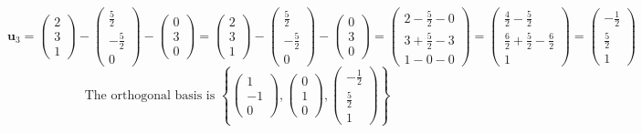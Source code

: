 \documentclass[a3paper,12pt]{extarticle} %
\begin{document}
\begin{enumerate}
\begin{enumerate}
\[        \]
        \[
            \mathbf{u}_3 = \begin{pmatrix} 2 \\ 3 \\ 1 \end{pmatrix} - \begin{pmatrix} \frac{5}{2} \\ -\frac{5}{2} \\ 0 \end{pmatrix} - \begin{pmatrix} 0 \\ 3 \\ 0 \end{pmatrix} = \begin{pmatrix} 2 \\ 3 \\ 1 \end{pmatrix} - \begin{pmatrix} \frac{5}{2} \\ -\frac{5}{2} \\ 0 \end{pmatrix} - \begin{pmatrix} 0 \\ 3 \\ 0 \end{pmatrix} = \begin{pmatrix} 2 - \frac{5}{2} - 0 \\ 3 + \frac{5}{2} - 3 \\ 1 - 0 - 0 \end{pmatrix} = \begin{pmatrix} \frac{4}{2} - \frac{5}{2} \\ \frac{6}{2} + \frac{5}{2} - \frac{6}{2} \\ 1 \end{pmatrix} = \begin{pmatrix} -\frac{1}{2} \\ \frac{5}{2} \\ 1 \end{pmatrix}
        \]
        \[
            \text{The orthogonal basis is } \left\{ \begin{pmatrix} 1 \\ -1 \\ 0 \end{pmatrix}, \begin{pmatrix} 0 \\ 1 \\ 0 \end{pmatrix}, \begin{pmatrix} -\frac{1}{2} \\ \frac{5}{2} \\ 1 \end{pmatrix} \right\}
\]
\end{enumerate}
\end{enumerate}
\end{document}
